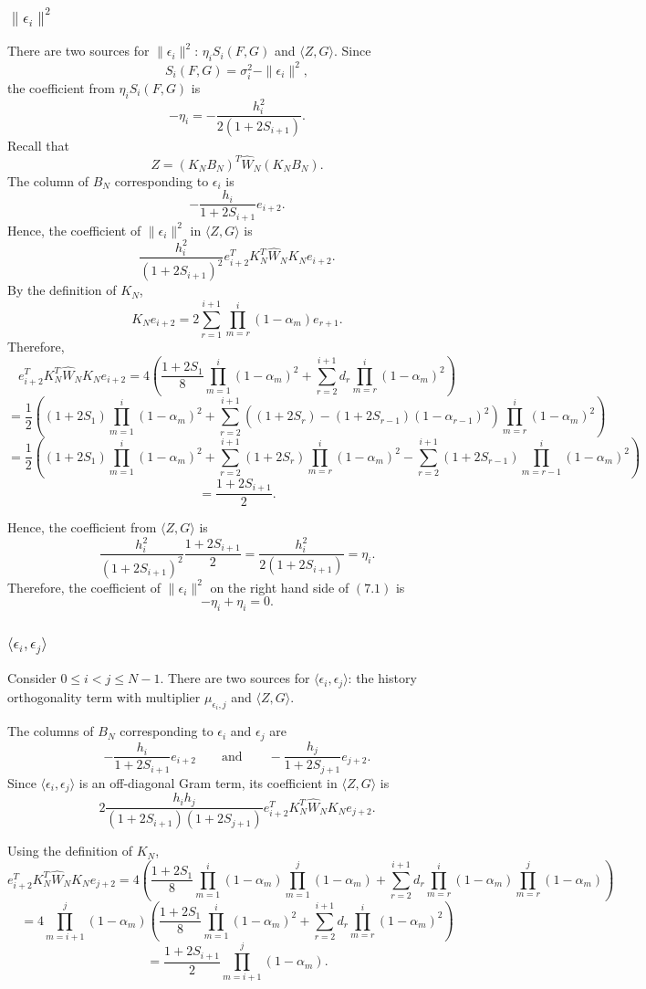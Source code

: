 {\subsubsection{$\|\epsilon_i\|^2$}
There are two sources for $\|\epsilon_i\|^2$: $\eta_i S_i(F,G)$ and $\langle Z,G\rangle$.
Since
\[S_i(F,G)=\sigma_i^2-\|\epsilon_i\|^2,\]
the coefficient from $\eta_i S_i(F,G)$ is
\[-\eta_i=-\frac{h_i^2}{2(1+2S_{i+1})}.\]
Recall that
\[Z=(K_NB_N)^T\widehat{W}_N(K_NB_N).\]
The column of $B_N$ corresponding to $\epsilon_i$ is
\[-\frac{h_i}{1+2S_{i+1}}e_{i+2}.\]
Hence, the coefficient of $\|\epsilon_i\|^2$ in $\langle Z,G\rangle$ is
\[\frac{h_i^2}{(1+2S_{i+1})^2}e_{i+2}^T K_N^T\widehat{W}_N K_N e_{i+2}.\]
By the definition of $K_N$,
\[K_Ne_{i+2}=2\sum_{r=1}^{i+1}\prod_{m=r}^{i}(1-\alpha_m)e_{r+1}.\]
Therefore,
\[e_{i+2}^T K_N^T\widehat{W}_N K_Ne_{i+2}=4\left(\frac{1+2S_1}{8}\prod_{m=1}^{i}(1-\alpha_m)^2+\sum_{r=2}^{i+1} d_r\prod_{m=r}^{i}(1-\alpha_m)^2\right)\]
\[=\frac{1}{2}\left((1+2S_1)\prod_{m=1}^{i}(1-\alpha_m)^2+\sum_{r=2}^{i+1}\left(
(1+2S_r)-(1+2S_{r-1})(1-\alpha_{r-1})^2\right)\prod_{m=r}^{i}(1-\alpha_m)^2\right)\]
\[=\frac{1}{2}\left((1+2S_1)\prod_{m=1}^{i}(1-\alpha_m)^2+\sum_{r=2}^{i+1}(1+2S_r)\prod_{m=r}^{i}(1-\alpha_m)^2-\sum_{r=2}^{i+1}(1+2S_{r-1})\prod_{m=r-1}^{i}(1-\alpha_m)^2\right)\]
\[=\frac{1+2S_{i+1}}{2}.\]

Hence, the coefficient from $\langle Z,G\rangle$ is
\[\frac{h_i^2}{(1+2S_{i+1})^2}\frac{1+2S_{i+1}}{2}=\frac{h_i^2}{2(1+2S_{i+1})}
=\eta_i.\]
Therefore, the coefficient of $\|\epsilon_i\|^2$ on the right hand side of $(7.1)$ is
\[-\eta_i+\eta_i=0.\]

\subsubsection{$\langle \epsilon_i,\epsilon_j\rangle$}

Consider $0\le i<j\le N-1$.
There are two sources for $\langle \epsilon_i,\epsilon_j\rangle$: 
the history orthogonality term with multiplier $\mu_{\epsilon_i,j}$ 
and $\langle Z,G\rangle$.

The columns of $B_N$ corresponding to $\epsilon_i$ and $\epsilon_j$ are
\[-\frac{h_i}{1+2S_{i+1}}e_{i+2}\qquad\text{and}\qquad
-\frac{h_j}{1+2S_{j+1}}e_{j+2}.\]
Since $\langle \epsilon_i,\epsilon_j\rangle$ is an off-diagonal Gram term, 
its coefficient in $\langle Z,G\rangle$ is
\[2\frac{h_ih_j}{(1+2S_{i+1})(1+2S_{j+1})}e_{i+2}^T K_N^T\widehat{W}_N K_Ne_{j+2}.\]

Using the definition of $K_N$,
\[e_{i+2}^T K_N^T\widehat{W}_N K_Ne_{j+2}=4\left(\frac{1+2S_1}{8}\prod_{m=1}^{i}(1-\alpha_m)
\prod_{m=1}^{j}(1-\alpha_m)+\sum_{r=2}^{i+1} d_r\prod_{m=r}^{i}(1-\alpha_m)\prod_{m=r}^{j}(1-\alpha_m)\right)\]
\[=4\prod_{m=i+1}^{j}(1-\alpha_m)\left(\frac{1+2S_1}{8}\prod_{m=1}^{i}(1-\alpha_m)^2+
\sum_{r=2}^{i+1} d_r\prod_{m=r}^{i}(1-\alpha_m)^2\right)\]
\[=\frac{1+2S_{i+1}}{2}\prod_{m=i+1}^{j}(1-\alpha_m).\]

}
